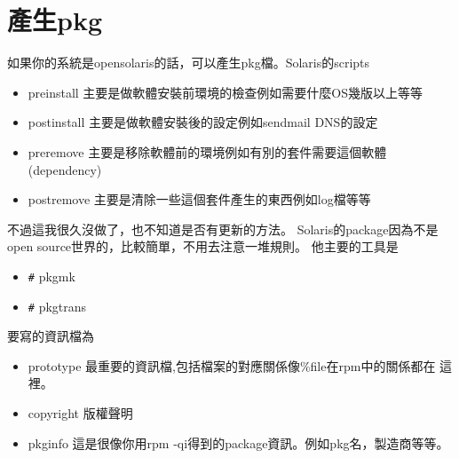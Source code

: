 \section{產生pkg}
如果你的系統是opensolaris的話，可以產生pkg檔。Solaris的scripts
\begin{itemize}
  \item preinstall   主要是做軟體安裝前環境的檢查例如需要什麼OS幾版以上等等
  \item postinstall  主要是做軟體安裝後的設定例如sendmail DNS的設定
  \item preremove    主要是移除軟體前的環境例如有別的套件需要這個軟體(dependency)
  \item postremove   主要是清除一些這個套件產生的東西例如log檔等等
\end{itemize}
不過這我很久沒做了，也不知道是否有更新的方法。
Solaris的package因為不是open source世界的，比較簡單，不用去注意一堆規則。
他主要的工具是
\begin{itemize}    
  \item \verb=#= pkgmk
  \item \verb=#= pkgtrans
\end{itemize}
要寫的資訊檔為
\begin{itemize}
  \item prototype  最重要的資訊檔,包括檔案的對應關係像\%file在rpm中的關係都在
    這裡。
  \item copyright  版權聲明
  \item pkginfo    這是很像你用rpm -qi得到的package資訊。例如pkg名，製造商等等。
\end{itemize}


